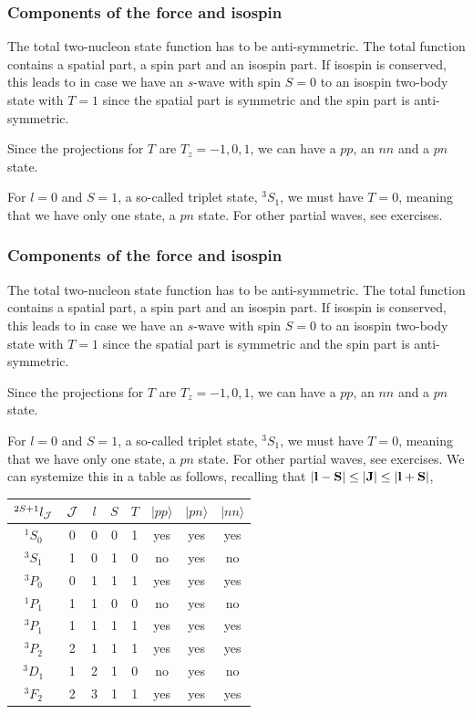 \documentclass[compress]{beamer}
\begin{document}
\frame
{
\frametitle{Components of the force and isospin}
\begin{small}
{\scriptsize
The total two-nucleon state function has to be anti-symmetric. The total function contains a spatial part, a spin part and an isospin part. If isospin is conserved, this leads to in case we have an $s$-wave with spin $S=0$ to an isospin 
two-body state with $T=1$ since the spatial part is symmetric and the spin part is anti-symmetric. 

Since the projections for $T$ are $T_z=-1,0,1$, we can have a $pp$, an $nn$ and a $pn$ state.

For $l=0$ and $S=1$, a so-called triplet state, $^3S_1$, we must have $T=0$, meaning that we have only one state, a $pn$ state. For other partial waves, see exercises. 
}
\end{small}
}



\frame
{
\frametitle{Components of the force and isospin}
\begin{small}
{\scriptsize
The total two-nucleon state function has to be anti-symmetric. The total function contains a spatial part, a spin part and an isospin part. If isospin is conserved, this leads to in case we have an $s$-wave with spin $S=0$ to an isospin 
two-body state with $T=1$ since the spatial part is symmetric and the spin part is anti-symmetric. 

Since the projections for $T$ are $T_z=-1,0,1$, we can have a $pp$, an $nn$ and a $pn$ state.

For $l=0$ and $S=1$, a so-called triplet state, $^3S_1$, we must have $T=0$, meaning that we have only one state, a $pn$ state. For other partial waves, see exercises. 
We can systemize this in a table as follows, recalling that $|{\bf l}-{\bf S}| \le |{\bf J}| \le |{\bf l}+{\bf S}|$,  
\begin{center}
\begin{tabular}{cccccccc} 
$^{2S+1}l_{\cal J}$ &${\cal J}$& $l$ & $S$  & $T$ & $|pp\rangle$ &$|pn\rangle$ &$|nn\rangle$  \\ \hline
$^{1}S_0$&0 &0 &0 &1  &yes &yes &yes \\ 
$^{3}S_1$&1 &0 &1 &0  &no &yes &no \\ 
$^{3}P_0$&0 &1 &1 &1  &yes &yes &yes \\ 
$^{1}P_1$&1 &1 &0 &0  &no &yes &no \\ 
$^{3}P_1$&1 &1 &1 &1  &yes &yes &yes \\ 
$^{3}P_2$&2 &1 &1 &1  &yes &yes &yes \\ 
$^{3}D_1$&1 &2 &1 &0  &no &yes &no \\ 
$^{3}F_2$&2 &3 &1 &1  &yes &yes &yes \\ \hline
\end{tabular}
\end{center}
}
\end{small}
}
\end{document}

